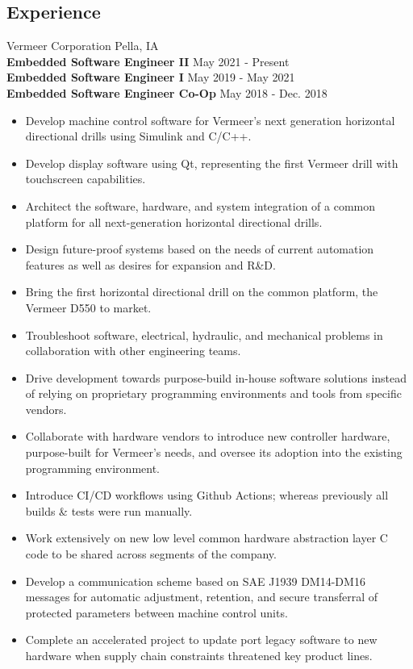 \documentclass[resmargin]{res}
\begin{document}
\begin{resume}
\section{Experience}
Vermeer Corporation \hfill Pella, IA\\
{\bf Embedded Software Engineer II} \hfill May 2021 - Present\\
{\bf Embedded Software Engineer I} \hfill May 2019 - May 2021\\
{\bf Embedded Software Engineer Co-Op} \hfill May 2018 - Dec. 2018
\begin{itemize}
	\item Develop machine control software for Vermeer's next generation horizontal directional drills using Simulink and C/C++.
	\item Develop display software using Qt, representing the first Vermeer drill with touchscreen capabilities.
	\item Architect the software, hardware, and system integration of a common platform for all next-generation horizontal directional drills.
	\item Design future-proof systems based on the needs of current automation features as well as desires for expansion and R\&D.
	\item Bring the first horizontal directional drill on the common platform, the Vermeer D550 to market.
	\item Troubleshoot software, electrical, hydraulic, and mechanical problems in collaboration with other engineering teams.
	\item Drive development towards purpose-build in-house software solutions instead of relying on proprietary programming environments and tools from specific vendors.
	\item Collaborate with hardware vendors to introduce new controller hardware, purpose-built for Vermeer's needs, and oversee its adoption into the existing programming environment.
	\item Introduce CI/CD workflows using Github Actions; whereas previously all builds \& tests were run manually.
	\item Work extensively on new low level common hardware abstraction layer C code to be shared across segments of the company.
	\item Develop a communication scheme based on SAE J1939 DM14-DM16 messages for automatic adjustment, retention, and secure transferral of protected parameters between machine control units.
	\item Complete an accelerated project to update port legacy software to new hardware when supply chain constraints threatened key product lines.


\end{itemize}
\end{resume}
\end{document}
